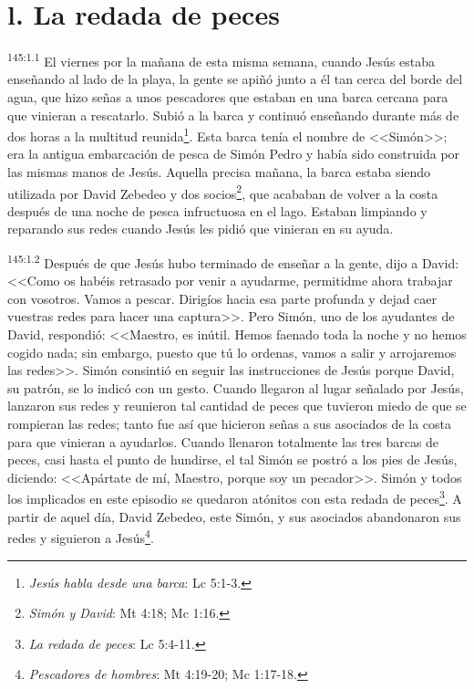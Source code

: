 \section*{l. La redada de peces}
\par 
\textsuperscript{145:1.1} El viernes por la mañana de esta misma semana, cuando Jesús estaba enseñando al lado de la playa, la gente se apiñó junto a él tan cerca del borde del agua, que hizo señas a unos pescadores que estaban en una barca cercana para que vinieran a rescatarlo. Subió a la barca y continuó enseñando durante más de dos horas a la multitud reunida\footnote{\textit{Jesús habla desde una barca}: Lc 5:1-3.}. Esta barca tenía el nombre de <<Simón>>; era la antigua embarcación de pesca de Simón Pedro y había sido construida por las mismas manos de Jesús. Aquella precisa mañana, la barca estaba siendo utilizada por David Zebedeo y dos socios\footnote{\textit{Simón y David}: Mt 4:18; Mc 1:16.}, que acababan de volver a la costa después de una noche de pesca infructuosa en el lago. Estaban limpiando y reparando sus redes cuando Jesús les pidió que vinieran en su ayuda.

\par 
\textsuperscript{145:1.2} Después de que Jesús hubo terminado de enseñar a la gente, dijo a David: <<Como os habéis retrasado por venir a ayudarme, permitidme ahora trabajar con vosotros. Vamos a pescar. Dirigíos hacia esa parte profunda y dejad caer vuestras redes para hacer una captura>>. Pero Simón, uno de los ayudantes de David, respondió: <<Maestro, es inútil. Hemos faenado toda la noche y no hemos cogido nada; sin embargo, puesto que tú lo ordenas, vamos a salir y arrojaremos las redes>>. Simón consintió en seguir las instrucciones de Jesús porque David, su patrón, se lo indicó con un gesto. Cuando llegaron al lugar señalado por Jesús, lanzaron sus redes y reunieron tal cantidad de peces que tuvieron miedo de que se rompieran las redes; tanto fue así que hicieron señas a sus asociados de la costa para que vinieran a ayudarlos. Cuando llenaron totalmente las tres barcas de peces, casi hasta el punto de hundirse, el tal Simón se postró a los pies de Jesús, diciendo: <<Apártate de mí, Maestro, porque soy un pecador>>. Simón y todos los implicados en este episodio se quedaron atónitos con esta redada de peces\footnote{\textit{La redada de peces}: Lc 5:4-11.}. A partir de aquel día, David Zebedeo, este Simón, y sus asociados abandonaron sus redes y siguieron a Jesús\footnote{\textit{Pescadores de hombres}: Mt 4:19-20; Mc 1:17-18.}.

